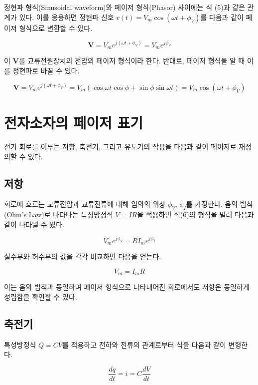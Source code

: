 \documentclass{article}
\begin{document}
정현파 형식(Sinusoidal waveform)와 페이저 형식(Phasor) 사이에는 식 (5)과 같은 관계가 있다. 이를 응용하면 정현파 신호 $v(t)=V_m \cos(\omega t+\phi_V)$를 다음과 같이 페이저 형식으로 변환할 수 있다.

\begin{equation}
    \boldsymbol{V}=V_m e^{j(\omega t+\phi_V)}=V_me^{j\phi_V}
\end{equation}

이 $\boldsymbol{V}$를 교류전원장치의 전압의 페이저 형식이라 한다. 반대로, 페이저 형식을 알 때 이를 정현파로 바꿀 수 있다.

\begin{equation}
    \boldsymbol{V}=V_m e^{j(\omega t+\phi_V)}=V_m(\cos\omega t\cos\phi+\sin\phi\sin\omega t)=V_m \cos(\omega t+\phi_V)
\end{equation}


\section{전자소자의 페이저 표기}
전기 회로를 이루는 저항, 축전기, 그리고 유도기의 작용을 다음과 같이 페이저로 재정의할 수 있다.

\subsection{저항}
회로에 흐르는 교류전압과 교류전류에 대해 임의의 위상 $\phi_V$, $\phi_I$를 가정한다. 옴의 법칙(Ohm's Law)로 나타나는 특성방정식 $V=IR$을 적용하면 식(6)의 형식을 빌려 다음과 같이 나타낼 수 있다.

\begin{equation}
    V_me^{j\phi_V}=RI_me^{j\phi_I}
\end{equation}

실수부와 허수부의 값을 각각 비교하면 다음을 얻는다.

\begin{equation}
    V_m=I_mR
\end{equation}

이는 옴의 법칙과 동일하며 페이저 형식으로 나타내어진 회로에서도 저항은 동일하게 성립함을 확인할 수 있다.

\subsection{축전기}
특성방정식 $Q=CV$를 적용하고 전하와 전류의 관계로부터 식을 다음과 같이 변형한다.

\begin{equation}
    \frac{dq}{dt}=i=C\frac{dV}{dt}
\end{equation}
\end{document}
